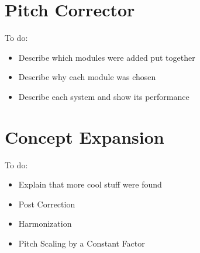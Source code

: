 \section{Pitch Corrector}

\color{red}
To do:
\begin{itemize}
	\item Describe which modules were added put together
	\item Describe why each module was chosen
	\item Describe each system and show its performance
\end{itemize}
\color{black}

\section{Concept Expansion}

\color{red}
To do:
\begin{itemize}
	\item Explain that more cool stuff were found
	\item Post Correction
	\item Harmonization
	\item Pitch Scaling by a Constant Factor
\end{itemize}
\color{black}
